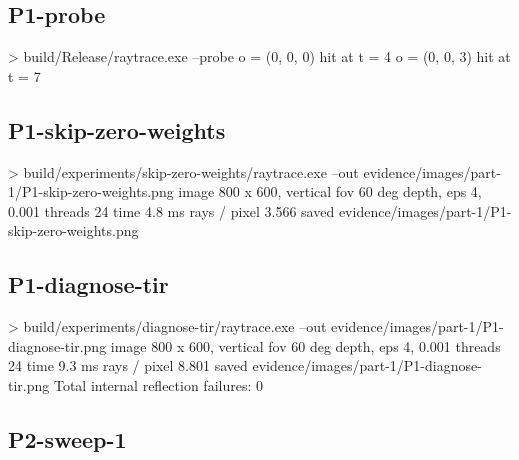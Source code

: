 \documentclass[11pt,a4paper]{article}
\begin{document}
\subsection*{P1-probe}
\begin{terminal}
> build/Release/raytrace.exe --probe
  o = (0, 0, 0)  hit at t = 4
  o = (0, 0, 3)  hit at t = 7
\end{terminal}
\subsection*{P1-skip-zero-weights}
\begin{terminal}
> build/experiments/skip-zero-weights/raytrace.exe --out
evidence/images/part-1/P1-skip-zero-weights.png
  image          800 x 600, vertical fov 60 deg
  depth, eps     4, 0.001
  threads        24
  time           4.8 ms
  rays / pixel   3.566
  saved          evidence/images/part-1/P1-skip-zero-weights.png
\end{terminal}
\subsection*{P1-diagnose-tir}
\begin{terminal}
> build/experiments/diagnose-tir/raytrace.exe --out
evidence/images/part-1/P1-diagnose-tir.png
  image          800 x 600, vertical fov 60 deg
  depth, eps     4, 0.001
  threads        24
  time           9.3 ms
  rays / pixel   8.801
  saved          evidence/images/part-1/P1-diagnose-tir.png
Total internal reflection failures: 0
\end{terminal}
\subsection*{P2-sweep-1}
\end{document}
